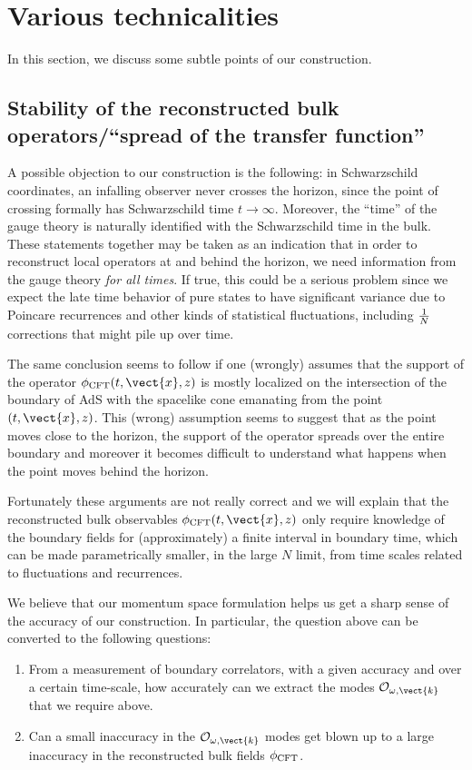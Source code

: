 \section{Various technicalities \label{sec:subtleties}}

In this section, we discuss some subtle points of our construction. 


\subsection{Stability of the reconstructed bulk operators/``spread of the transfer function''}

A possible objection to our construction is the following: in Schwarzschild coordinates, an infalling observer never crosses the horizon, since the point of crossing formally has Schwarzschild time $t\rightarrow \infty$. Moreover, the  ``time'' of the gauge theory is naturally identified with the Schwarzschild time in the bulk. These statements together may be taken as an indication that in order to reconstruct local operators at and behind the horizon, we need information from the gauge theory {\it for all times}. If true, this could be a serious problem since we expect the late time behavior of pure states to have significant variance due to Poincare recurrences and other kinds of statistical fluctuations, including ${1 \over N}$ 
corrections that might pile up over time.

The same conclusion seems to follow if one (wrongly) assumes that the support of the operator $\phi_{\rm CFT}(t,\vect{x},z)$ is mostly localized on the intersection of the boundary of AdS with the spacelike cone emanating from the point $(t,\vect{x},z)$. This (wrong) assumption seems to suggest that as the point moves close to the horizon, the support of the operator spreads over the entire boundary and moreover it becomes difficult to understand what happens when the point moves behind the horizon.

Fortunately these arguments are not really correct and we will explain that the reconstructed bulk observables $\phi_{\rm CFT}(t,\vect{x},z)$ only require knowledge of the boundary fields for (approximately) a finite interval in boundary time, which can be made parametrically smaller, in the large $N$ limit, from time scales related to fluctuations and recurrences. 



We believe that our momentum space formulation helps us get a sharp sense of the accuracy of our construction. In particular, the question above can be converted to the following questions:
\begin{enumerate}
\item
From a measurement of boundary correlators, with a given accuracy and over a certain time-scale, how accurately can we extract the modes ${\cal O}_{\omega,\vect{k}}$ that we require above.
\item
Can a small inaccuracy in the ${\cal O}_{\omega,\vect{k}}$ modes get blown up to a large inaccuracy in the reconstructed bulk fields $\phi_{\rm CFT}$.
\end{enumerate}

